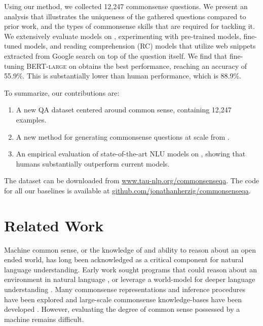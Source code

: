 Using our method, we collected 12,247 commonsense questions. We present an analysis that illustrates the uniqueness of the gathered questions compared to prior work, and the types of commonsense skills that are required for tackling it. We extensively evaluate models on \csqa{}, experimenting with pre-trained models, fine-tuned models, and reading comprehension (RC) models that utilize web snippets extracted from Google search on top of the question itself. We find that fine-tuning \textsc{BERT-large} \cite{devlin2018BERT} on \csqa{} obtains the best performance, reaching an accuracy of 55.9\%. This is substantially lower than human performance, which is 88.9\%.

To summarize, our contributions are:

\begin{enumerate}[topsep=0pt,itemsep=0ex,parsep=0ex]
    \item A new QA dataset centered around common sense, containing 12,247 examples.
    \item A new method for generating commonsense questions at scale from \conceptnet{}.
    \item An empirical evaluation of state-of-the-art NLU models on \csqa{}, showing that humans substantially outperform current models.
\end{enumerate}

The dataset can be downloaded from  \url{www.tau-nlp.org/commonsenseqa}. The code for all our baselines is available at \url{github.com/jonathanherzig/commonsenseqa}.

\section{Related Work}
\label{sec:related_work}

Machine common sense, or the knowledge of and ability to reason about an open ended world, has long been acknowledged as a critical component for natural language understanding. Early work sought programs that could reason about an environment in natural language \cite{mccarthy1959programs}, or leverage a world-model for deeper language understanding \cite{winograd1972language}. Many commonsense representations and inference procedures have been explored \cite{McCHay69,Kowalski:1986:LCE:10030.10034} and large-scale commonsense knowledge-bases have been developed \cite{Lenat1995CYCAL,speer2017conceptnet}. However, evaluating the degree of common sense possessed by a machine remains difficult.

